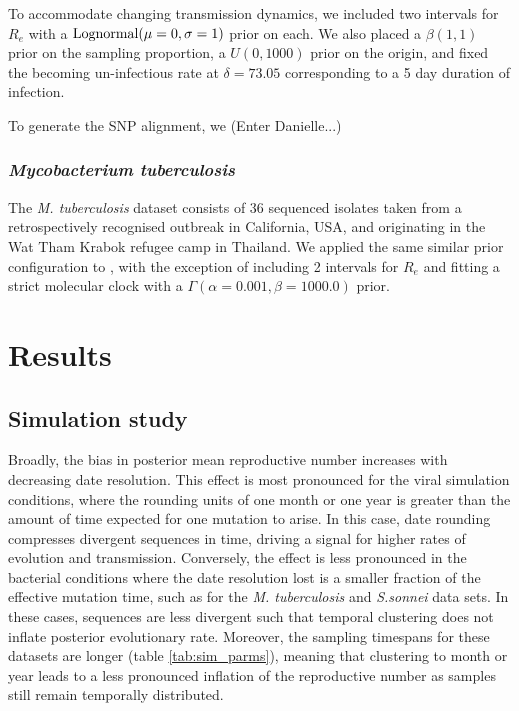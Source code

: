 \documentclass{article}
\begin{document}
\begin{spacing}{1.5}
To accommodate changing transmission dynamics, we included two intervals for $R_e$ with a $\textnormal{Lognormal}(\mu=0,\sigma=1)$ prior on each. We also placed a $\beta(1,1)$ prior on the sampling proportion, a $U(0,1000)$ prior on the origin, and fixed the becoming un-infectious rate at $\delta=73.05$ corresponding to a 5 day duration of infection.

To generate the SNP alignment, we (Enter Danielle...)

\subsubsection*{\textit{Mycobacterium tuberculosis}}
The \textit{M. tuberculosis} dataset consists of 36 sequenced isolates taken from a retrospectively recognised outbreak in California, USA, and originating in the Wat Tham Krabok refugee camp in Thailand. We applied the same similar prior configuration to \citet{kuhnert_tuberculosis_2018}, with the exception of including 2 intervals for $R_e$ and fitting a strict molecular clock with a $\Gamma(\alpha=0.001,\beta=1000.0)$ prior.


\section*{Results}
\subsection*{Simulation study}
Broadly, the bias in posterior mean reproductive number increases with decreasing date resolution. This effect is most pronounced for the viral simulation conditions, where the rounding units of one month or one year is greater than the amount of time expected for one mutation to arise. In this case, date rounding compresses divergent sequences in time, driving a signal for higher rates of evolution and transmission. Conversely, the effect is less pronounced in the bacterial conditions where the date resolution lost is a smaller fraction of the effective mutation time, such as for the \textit{M. tuberculosis} and \textit{S.sonnei} data sets. In these cases, sequences are less divergent such that temporal clustering does not inflate posterior evolutionary rate. Moreover, the sampling timespans for these datasets are longer (table \ref{tab:sim_parms}), meaning that clustering to month or year leads to a less pronounced inflation of the reproductive number as samples still remain temporally distributed.


\end{spacing}
\end{document}
